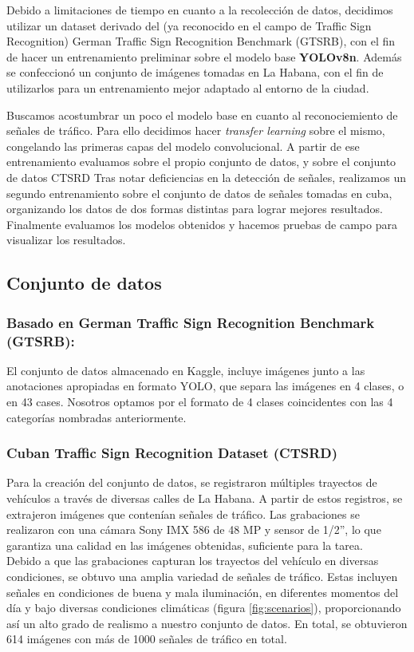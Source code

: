 \documentclass{article}
\begin{document}
Debido a limitaciones de tiempo en cuanto a la recolección de datos, decidimos utilizar un dataset derivado del (ya reconocido en el campo de Traffic Sign Recognition) German Traffic Sign Recognition Benchmark (GTSRB), con el fin de hacer un entrenamiento preliminar sobre el modelo base \textbf{YOLOv8n}. Además se confeccionó un conjunto de imágenes tomadas en La Habana, con el fin de utilizarlos para un entrenamiento mejor adaptado al entorno de la ciudad.

Buscamos acostumbrar un poco el modelo base en cuanto al reconociemiento de señales de tráfico. Para ello decidimos hacer \textit{transfer learning} sobre el mismo, congelando las primeras capas del modelo convolucional. A partir de ese entrenamiento evaluamos sobre el propio conjunto de datos, y sobre el conjunto de datos CTSRD Tras notar deficiencias en la detección de señales, realizamos un segundo entrenamiento sobre el conjunto de datos de señales tomadas en cuba, organizando los datos de dos formas distintas para lograr mejores resultados. Finalmente evaluamos los modelos obtenidos y hacemos pruebas de campo para visualizar los resultados. 



\subsection{Conjunto de datos}
\subsubsection{Basado en German Traffic Sign Recognition Benchmark (GTSRB):}
El conjunto de datos almacenado en Kaggle, incluye imágenes junto a las anotaciones apropiadas en formato YOLO, que separa las imágenes en 4 clases, o en 43 cases. Nosotros optamos por el formato de 4 clases coincidentes con las 4 categorías nombradas anteriormente.
\subsubsection{Cuban Traffic Sign Recognition Dataset (CTSRD)}
Para la creación del conjunto de datos, se registraron múltiples trayectos de vehículos a través de diversas calles de La Habana. A partir de estos registros, se extrajeron imágenes que contenían señales de tráfico. Las grabaciones se realizaron con una cámara Sony IMX 586 de 48 MP y sensor de 1/2”, lo que garantiza una calidad en las imágenes obtenidas, suficiente para la tarea.\\
Debido a que las grabaciones capturan los trayectos del vehículo en diversas condiciones, se obtuvo una amplia variedad de señales de tráfico. Estas incluyen señales en condiciones de buena y mala iluminación, en diferentes momentos del día y bajo diversas condiciones climáticas (figura \ref{fig:scenarios}), proporcionando así un alto grado de realismo a nuestro conjunto de datos. En total, se obtuvieron 614 imágenes con más de 1000 señales de tráfico en total.
\end{document}
